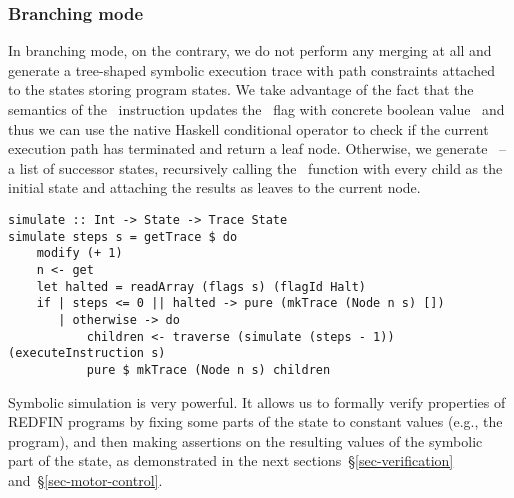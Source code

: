 \subsubsection{Branching mode}

In branching mode, on the contrary, we do not perform any merging at all and generate a
tree-shaped symbolic execution trace with path constraints attached to the states storing
program states. We take advantage of the fact that the semantics of the~
instruction updates the~ flag with concrete boolean value~ and thus we
can use the native Haskell conditional operator to check if the current execution path
has terminated and return a leaf node. Otherwise, we generate~ -- a list of successor states, recursively calling the~ function with every child as the initial state and attaching the results as leaves to the current node.

\begin{verbatim}
simulate :: Int -> State -> Trace State
simulate steps s = getTrace $ do
    modify (+ 1)
    n <- get
    let halted = readArray (flags s) (flagId Halt)
    if | steps <= 0 || halted -> pure (mkTrace (Node n s) [])
       | otherwise -> do
           children <- traverse (simulate (steps - 1)) (executeInstruction s)
           pure $ mkTrace (Node n s) children
\end{verbatim}

Symbolic simulation is very powerful. It allows us to formally verify properties
of REDFIN programs by fixing some parts of the state to constant values (e.g.,
the program), and then making assertions on the resulting values of
the symbolic part of the state, as demonstrated in the next
sections~\S\ref{sec-verification} and~\S\ref{sec-motor-control}.
